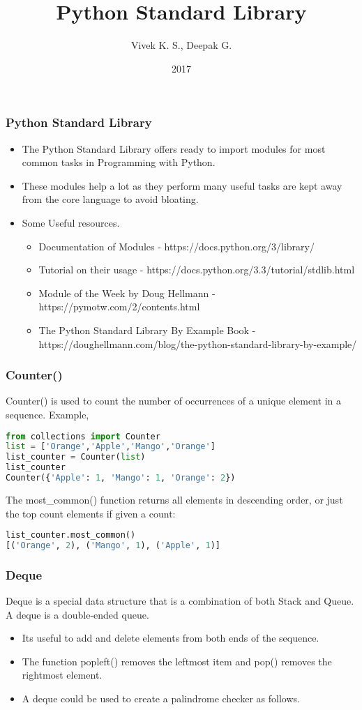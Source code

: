 \documentclass{beamer}
\title{Python Standard Library}
\author{Vivek K. S., Deepak G.}
\institute{Information Systems Decision Sciences (ISDS)\\
MUMA College of Business\\
University of South Florida \\
Tampa, Florida}
\date{2017}
\begin{document}
\frame{\titlepage}

\begin{frame}[fragile]
\frametitle{Python Standard Library}
\begin{itemize}
\item The Python Standard Library offers ready to import modules for most common tasks in Programming with Python.
\item These modules help a lot as they perform many useful tasks are kept away from the core language to avoid bloating.
\item Some Useful resources.
\begin{itemize}
\item Documentation of Modules - https://docs.python.org/3/library/
\item Tutorial on their usage - https://docs.python.org/3.3/tutorial/stdlib.html
\item Module of the Week by Doug
Hellmann - https://pymotw.com/2/contents.html
\item The Python Standard Library By Example Book - https://doughellmann.com/blog/the-python-standard-library-by-example/
\end{itemize}
\end{itemize}
\end{frame}

\begin{frame}[fragile]
\frametitle{Counter()}
Counter() is used to count the number of occurrences of a unique element in a sequence.
Example,
\begin{lstlisting}[language=Python]
from collections import Counter
list = ['Orange','Apple','Mango','Orange']
list_counter = Counter(list)
list_counter
Counter({'Apple': 1, 'Mango': 1, 'Orange': 2})
\end{lstlisting}
The most\_common() function returns all elements in descending order, or just the top
count elements if given a count:
\begin{lstlisting}[language=Python]
list_counter.most_common()
[('Orange', 2), ('Mango', 1), ('Apple', 1)]
\end{lstlisting}
\end{frame}

\begin{frame}
\frametitle{Deque}
Deque is a special data structure that is a combination of both Stack and Queue. A deque is a double-ended queue. 
\begin{itemize}

\item Its useful to add and delete elements from both ends of the sequence.
\item The function popleft() removes the leftmost item and pop() removes the rightmost element.
\item A deque could be used to create a palindrome checker as follows.
\end{itemize}
\end{frame}
\end{document}
